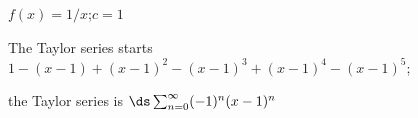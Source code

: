 {$f(x) = 1/x$;\quad $c=1$
}
{The Taylor series starts $1-(x-1)+(x-1)^2-(x-1)^3+(x-1)^4-(x-1)^5$; 

the Taylor series is $\ds \sum_{n=0}^\infty (-1)^{n}(x-1)^n$
}